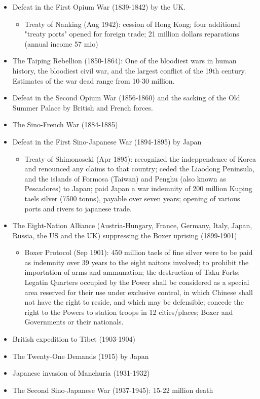 \begin{itemize}
    \item Defeat in the First Opium War (1839-1842) by the UK.
        \begin{itemize}
            \item Treaty of Nanking (Aug 1942): cession of Hong Kong; four
                additional "treaty ports" opened for foreign trade; 21 million
                dollars reparations (annual income 57 mio)
        \end{itemize}
    \item The Taiping Rebellion (1850-1864): One of the bloodiest wars in
        human history, the bloodiest civil war, and the largest conflict of
        the 19th century. Estimates of the war dead range from 10-30 million.
    \item Defeat in the Second Opium War (1856-1860) and the sacking of the
        Old Summer Palace by British and French forces.
    \item The Sino-French War (1884-1885)
    \item Defeat in the First Sino-Japanese War (1894-1895) by Japan
        \begin{itemize}
            \item Treaty of Shimonoseki (Apr 1895): recognized the indeppendence
                of Korea and renounced any claims to that country; ceded the
                Liaodong Peninsula, and the islands of Formosa (Taiwan) and
                Penghu (also known as Pescadores) to Japan; paid Japan a war
                indemnity of 200 million Kuping taels silver (7500 tonns),
                payable over seven years; opening of various ports and rivers to
                japanese trade.
        \end{itemize}
    \item The Eight-Nation Alliance (Austria-Hungary, France, Germany, Italy,
        Japan, Russia, the US and the UK) suppressing the Boxer uprising (1899-1901)
        \begin{itemize}
            \item Boxer Protocol (Sep 1901): 450 million taels of fine silver
                were to be paid as indemnity over 39 years to the eight naitons
                involved; to prohibit the importation of arms and ammunation; the
                destruction of Taku Forts; Legatin Quarters occupied by the
                Power shall be considered as a special area reserved for their
                use under exclusive control, in which Chinese shall not have the
                right to reside, and which may be defensible; concede the right
                to the Powers to station troops in 12 cities/places; Boxer and
                Governments or their nationals.
        \end{itemize}
    \item British expedition to Tibet (1903-1904)
    \item The Twenty-One Demands (1915) by Japan
    \item Japanese invasion of Manchuria (1931-1932)
    \item The Second Sino-Japanese War (1937-1945): 15-22 million death
\end{itemize}


